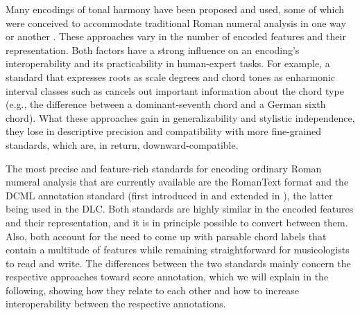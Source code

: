 \documentclass[sigconf]{acmart} %
\begin{document}
Many encodings of tonal harmony have been proposed and used, some of which were conceived to accommodate traditional Roman numeral analysis in one way or another \cite{Huron2020_HarmRepresentationWestern,Temperley2013_StatisticalAnalysisHarmony,Cambouropoulos2016_HarmonicMusicalSurface,White2016_YaleClassicalArchivesCorpus,Chen2018_FunctionalHarmonyRecognition,Tymoczko2019_RomanTextFormatFlexible}.
These approaches vary in the number of encoded features and their representation. Both factors have a strong influence on an encoding's interoperability and its practicability in human-expert tasks. 
For example, a standard that expresses roots as scale degrees and chord tones as enharmonic interval classes such as \cite{Cambouropoulos2016_HarmonicMusicalSurface} cancels out important information about the chord type (e.g., the difference between a dominant-seventh chord and a German sixth chord). What these approaches gain in generalizability and stylistic independence, they lose in descriptive precision and compatibility with more fine-grained standards, which are, in return, downward-compatible.

The most precise and feature-rich standards for encoding ordinary Roman numeral analysis that are currently available are the RomanText format \cite{Tymoczko2019_RomanTextFormatFlexible} and the DCML annotation standard (first introduced in \cite{Neuwirth2018_AnnotatedBeethovenCorpus} and extended in \cite{Hentschel2021_AnnotatedMozartSonatasa}), the latter being used in the DLC. Both standards are highly similar in the encoded features and their representation, and it is in principle possible to convert between them. Also, both account for the need to come up with parsable chord labels that contain a multitude of features while remaining straightforward for musicologists to read and write. The differences between the two standards mainly concern the respective approaches toward score annotation, which we will explain in the following, showing how they relate to each other and how to increase interoperability between the respective annotations. 
\end{document}

